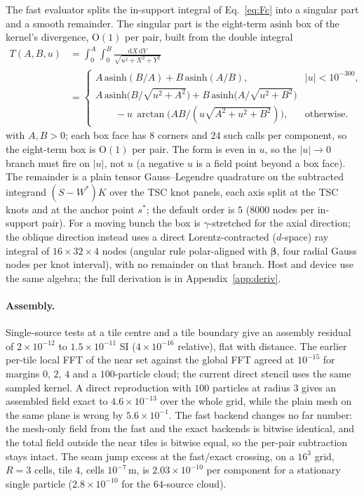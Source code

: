 The fast evaluator splits the in-support integral of Eq.~\eqref{eq:Fc} into
a singular part and a smooth remainder. The singular part is the eight-term
$\mathrm{asinh}$ box of the kernel's divergence, $\mathrm{O}(1)$ per pair,
built from the double integral
\begin{equation}
\label{eq:Tprimitive}
\begin{split}
T(A,B,u)&=\int_0^A\!\int_0^B\frac{\mathrm{d}X\,\mathrm{d}Y}
{\sqrt{u^2+X^2+Y^2}}\\
&=\begin{cases}
A\,\mathrm{asinh}(B/A)+B\,\mathrm{asinh}(A/B), & |u|<10^{-300},\\[2pt]
A\,\mathrm{asinh}\!\bigl(B/\sqrt{u^2+A^2}\bigr)
+B\,\mathrm{asinh}\!\bigl(A/\sqrt{u^2+B^2}\bigr)\\
\qquad
-u\,\arctan\!\bigl(AB/(u\sqrt{A^2+u^2+B^2})\bigr), & \text{otherwise.}
\end{cases}
\end{split}
\end{equation}
with $A,B>0$; each box face has $8$ corners and $24$ such calls per
component, so the eight-term box is $\mathrm{O}(1)$ per pair. The form is
even in $u$, so the $|u|\to0$ branch must fire on $|u|$, not $u$ (a
negative $u$ is a field point beyond a box face). The remainder is a plain
tensor Gauss--Legendre quadrature on the subtracted integrand
$(S-W^\ast)K$ over the TSC knot panels, each axis split at the TSC knots and
at the anchor point $s^\ast$; the default order is $5$ ($8000$ nodes per
in-support pair). For a moving bunch the box is $\gamma$-stretched for the
axial direction; the oblique direction instead uses a direct
Lorentz-contracted ($d$-space) ray integral of $16\times32\times4$ nodes
(angular rule polar-aligned with $\boldsymbol\beta$, four radial Gauss nodes
per knot interval), with no remainder on that branch. Host and device use the
same algebra; the full derivation is in Appendix~\ref{app:deriv}.

\paragraph{Assembly.}
Single-source tests at a tile centre and a tile boundary give an assembly
residual of $2\!\times\!10^{-12}$ to $1.5\!\times\!10^{-11}$ SI
($4\!\times\!10^{-16}$ relative), flat with distance. The earlier
per-tile local FFT of the near set against the global FFT agreed at
$10^{-15}$ for margins $0$, $2$, $4$ and a $100$-particle cloud; the
current direct stencil uses the same sampled kernel. A direct reproduction
with $100$ particles
at radius $3$ gives an assembled field exact to $4.6\!\times\!10^{-13}$
over the whole grid, while the plain mesh on the same plane is wrong by
$5.6\!\times\!10^{-1}$. The fast backend changes no far number: the
mesh-only field from the fast and the exact backends is bitwise identical,
and the total field outside the near tiles is bitwise equal, so the per-pair
subtraction stays intact. The seam jump excess at the fast/exact crossing,
on a $16^3$ grid, $R=3$ cells, tile $4$, cells $10^{-7}$\,m, is
$2.03\!\times\!10^{-10}$ per component for a stationary single particle
($2.8\!\times\!10^{-10}$ for the $64$-source cloud).

